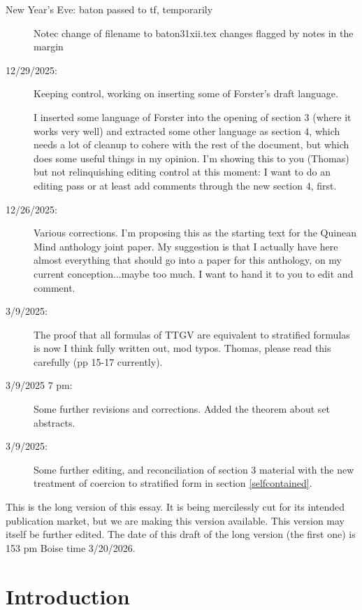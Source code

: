 \documentclass[12pt]{article}
\begin{document}
{\begin{description}
\item[New Year's Eve: baton passed to tf, temporarily]   Notec change of filename to baton31xii.tex
  changes flagged by notes in the margin
  
\item[12/29/2025:]  Keeping control, working on inserting some of Forster's draft language.

I inserted some language of Forster into the opening of section 3 (where it works very well) and extracted
some other language as section 4, which needs a lot of cleanup to cohere with the rest of the document, but which does some useful things in my opinion.  I'm showing this to you (Thomas) but not relinquishing editing control at this moment:  I want to do an editing pass or at least add comments through the new section 4, first.

\item[12/26/2025:]  Various corrections.  I'm proposing this as the starting text for the Quinean Mind anthology joint paper.  My suggestion is that I actually have here almost everything that should go into a paper for this anthology, on my current conception...maybe too much.  I want to hand it to you to edit and comment.

\item[3/9/2025:]  The proof that all formulas of TTGV are equivalent to stratified formulas is now I think fully written out, mod typos.  Thomas, please read this carefully (pp 15-17 currently).

\item[3/9/2025 7 pm:]  Some further revisions and corrections.  Added the theorem about set abstracts.

\item[3/9/2025:]  Some further editing, and reconciliation of section 3 material with the new treatment of coercion to stratified form in section \ref{selfcontained}.

\end{description}

\newpage
}
\tableofcontents

This is the long version of this essay.  It is being mercilessly cut for its intended publication market, but we are making this version available.  This version may itself be further edited.  The date of this draft of the long version (the first one) is 153 pm Boise time 3/20/2026.


\newpage

\section{Introduction}
\end{document}
